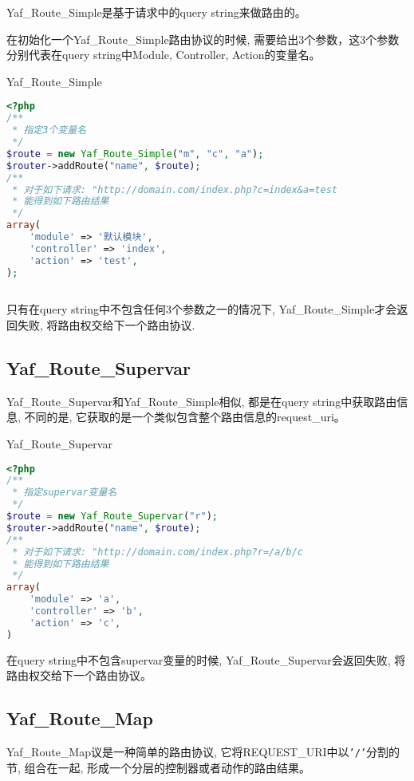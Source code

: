 Yaf\_Route\_Simple是基于请求中的query string来做路由的。

在初始化一个Yaf\_Route\_Simple路由协议的时候, 需要给出3个参数，这3个参数分别代表在query string中Module, Controller, Action的变量名。

\begin{example}
 Yaf\_Route\_Simple
\begin{lstlisting}[language=PHP]
<?php
/**
 * 指定3个变量名
 */
$route = new Yaf_Route_Simple("m", "c", "a");
$router->addRoute("name", $route);
/**
 * 对于如下请求: "http://domain.com/index.php?c=index&a=test
 * 能得到如下路由结果
 */
array(
    'module' => '默认模块',
    'controller' => 'index',
    'action' => 'test',
);
     
\end{lstlisting}
\end{example}

只有在query string中不包含任何3个参数之一的情况下, Yaf\_Route\_Simple才会返回失败, 将路由权交给下一个路由协议.

\subsection{Yaf\_Route\_Supervar}

Yaf\_Route\_Supervar和Yaf\_Route\_Simple相似, 都是在query string中获取路由信息, 不同的是, 它获取的是一个类似包含整个路由信息的request\_uri。


\begin{example}
Yaf\_Route\_Supervar
\begin{lstlisting}[language=PHP]
<?php
/**
 * 指定supervar变量名
 */
$route = new Yaf_Route_Supervar("r");
$router->addRoute("name", $route);
/**
 * 对于如下请求: "http://domain.com/index.php?r=/a/b/c
 * 能得到如下路由结果
 */
array(
    'module' => 'a',
    'controller' => 'b',
    'action' => 'c',
)
\end{lstlisting}
\end{example}

在query string中不包含supervar变量的时候, Yaf\_Route\_Supervar会返回失败, 将路由权交给下一个路由协议。

\subsection{Yaf\_Route\_Map}

Yaf\_Route\_Map议是一种简单的路由协议, 它将REQUEST\_URI中以\texttt{'/'}分割的节, 组合在一起, 形成一个分层的控制器或者动作的路由结果。

